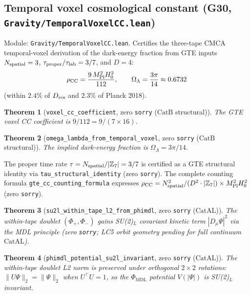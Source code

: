 \documentclass[11pt,a4paper]{article}
\newtheorem{theorem}{Theorem}[section]
\theoremstyle{definition}
\newcommand{\CatAL}{\ensuremath{\mathrm{CatAL}}}
\newcommand{\CatB}{\ensuremath{\mathrm{CatB}}}
\begin{document}
\subsection{Temporal voxel cosmological constant (G30,
  \texttt{Gravity/TemporalVoxelCC.lean})}\label{subsec:temporal-voxel-cc}

Module: \texttt{Gravity/TemporalVoxelCC.lean}.  Certifies the three-tape CMCA
temporal-voxel derivation of the dark-energy fraction from GTE inputs
$N_{\rm spatial}=3$, $\tau_{\rm proper}/\tau_{\rm lab}=3/7$, and $D=4$:
\[
\rho_{\rm CC} = \frac{9\,M_{\rm Pl}^2 H_0^2}{112},
\qquad
\Omega_\Lambda = \frac{3\pi}{14} \approx 0.6732
\]
(within $2.4\%$ of $D_{\rm res}$ and $2.3\%$ of Planck 2018).

\begin{theorem}[\lstinline|voxel_cc_coefficient|, zero \texttt{sorry} ($\CatB$ structural)]
The GTE voxel CC coefficient is $9/112 = 9/(7{\times}16)$.
\end{theorem}

\begin{theorem}[\lstinline|omega_lambda_from_temporal_voxel|, zero \texttt{sorry} ($\CatB$ structural)]
The implied dark-energy fraction is $\Omega_\Lambda = 3\pi/14$.
\end{theorem}

The proper time rate $\tau = N_{\rm spatial}/|\mathbb{Z}_7| = 3/7$ is certified as a
GTE structural identity via \lstinline|tau_structural_identity| (zero \texttt{sorry}).
The complete counting formula \lstinline|gte_cc_counting_formula| expresses
$\rho_{\rm CC} = N_{\rm spatial}^2/(D^2 \cdot |\mathbb{Z}_7|) \times M_{\rm Pl}^2 H_0^2$
(zero \texttt{sorry}).

\begin{theorem}[\lstinline|su2l_within_tape_l2_from_phimdl|, zero \texttt{sorry} ($\CatAL$)]
The within-tape doublet $(\Phi_+,\Phi_-)$ gains SU(2)$_L$ covariant kinetic term
$|D_\mu\Psi|^2$ via the MDL principle (zero \texttt{sorry}; LC5 orbit geometry
pending for full continuum $\CatAL$).
\end{theorem}

\begin{theorem}[\lstinline|phimdl_potential_su2l_invariant|, zero \texttt{sorry} ($\CatAL$)]
The within-tape doublet L2 norm is preserved under orthogonal $2\times2$ rotations:
$\|U\Psi\|_2=\|\Psi\|_2$ when $U^\top U=1$, so the $\Phi_{\mathrm{MDL}}$ potential
$V(|\Psi|)$ is SU(2)$_L$ invariant.
\end{theorem}
\end{document}
